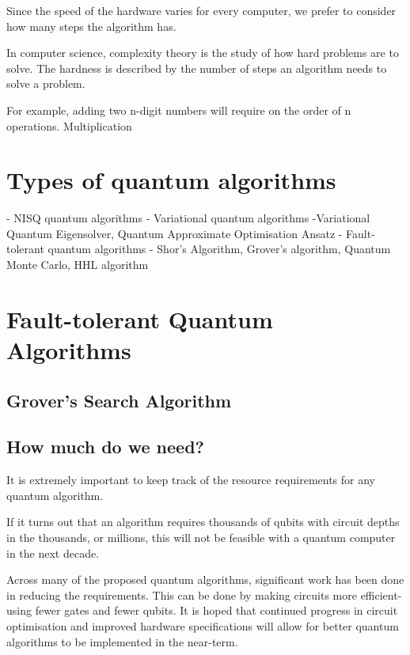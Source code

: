 \documentclass{book}
\begin{document}
Since the speed of the hardware varies for every computer, we prefer to consider how many steps the algorithm has. 

In computer science, complexity theory is the study of how hard problems are to solve. The hardness is described by the number of steps an algorithm needs to solve a problem.

For example, adding two n-digit numbers will require on the order of n operations. Multiplication 



\section{ Types of quantum algorithms} 


- NISQ quantum algorithms 
- Variational quantum algorithms 
    -Variational Quantum Eigensolver, Quantum Approximate Optimisation Ansatz
- Fault-tolerant quantum algorithms 
    - Shor's Algorithm, Grover's algorithm, Quantum Monte Carlo,  HHL algorithm 


\section{Fault-tolerant Quantum Algorithms} 

\subsection{ Grover's Search Algorithm}



\subsection{How much do we need?}

It is extremely important to keep track of the resource requirements for any quantum algorithm. 

If it turns out that an algorithm requires thousands of qubits with circuit depths in the thousands, or millions, this will not be feasible with a quantum computer in the next decade. 

Across many of the proposed quantum algorithms, significant work has been done in reducing the requirements. This can be done by making circuits more efficient- using fewer gates and fewer qubits.  It is hoped that continued progress in circuit optimisation and improved hardware specifications will allow for better quantum algorithms to be implemented in the near-term. 
\end{document}
